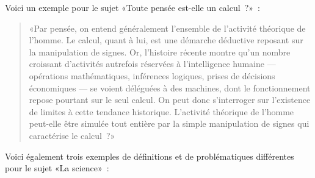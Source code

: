 \documentclass[a4paper,11pt]{article}
\begin{document}
\par

Voici un exemple pour le sujet «Toute pensée est-elle un calcul~?»~:
\begin{quote}
  «Par pensée, on entend généralement l'ensemble de l'activité théorique
  de l'homme. Le calcul, quant à lui, est une démarche déductive
  reposant sur la manipulation de signes. Or, l'histoire récente montre
  qu'un nombre croissant d'activités autrefois réservées à
  l'intelligence humaine --- opérations mathématiques, inférences
  logiques, prises de décisions économiques --- se voient déléguées à
  des machines, dont le fonctionnement repose pourtant sur le seul
  calcul. On peut donc s'interroger sur l'existence de limites à cette
  tendance historique. L'activité théorique de l'homme peut-elle être
  simulée tout entière par la simple manipulation de signes qui
  caractérise le calcul~?»
\end{quote}

Voici également trois exemples de définitions et de problématiques
différentes pour le sujet «La science»~:
\end{document}
